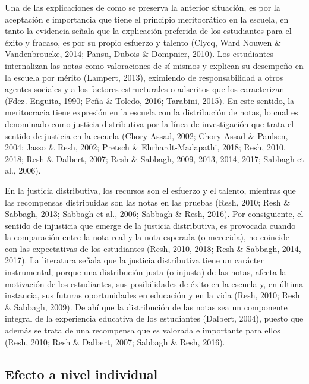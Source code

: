 \documentclass[12pt,twoside]{templates/facsothesis}
\begin{document}
Una de las explicaciones de como se preserva la anterior situación, es por la aceptación e importancia que tiene el principio meritocrático en la escuela, en tanto la evidencia señala que la explicación preferida de los estudiantes para el éxito y fracaso, es por su propio esfuerzo y talento (Clycq, Ward Nouwen \& Vandenbroucke, 2014; Pansu, Dubois \& Dompnier, 2010). Los estudiantes internalizan las notas como valoraciones de sí mismos y explican su desempeño en la escuela por mérito (Lampert, 2013), eximiendo de responsabilidad a otros agentes sociales y a los factores estructurales o adscritos que los caracterizan (Fdez. Enguita, 1990; Peña \& Toledo, 2016; Tarabini, 2015). En este sentido, la meritocracia tiene expresión en la escuela con la distribución de notas, lo cual es denominado como justicia distributiva por la línea de investigación que trata el sentido de justicia en la escuela (Chory-Assad, 2002; Chory-Assad \& Paulsen, 2004; Jasso \& Resh, 2002; Pretsch \& Ehrhardt-Madapathi, 2018; Resh, 2010, 2018; Resh \& Dalbert, 2007; Resh \& Sabbagh, 2009, 2013, 2014, 2017; Sabbagh et al., 2006).

En la justicia distributiva, los recursos son el esfuerzo y el talento, mientras que las recompensas distribuidas son las notas en las pruebas (Resh, 2010; Resh \& Sabbagh, 2013; Sabbagh et al., 2006; Sabbagh \& Resh, 2016). Por consiguiente, el sentido de injusticia que emerge de la justicia distributiva, es provocada cuando la comparación entre la nota real y la nota esperada (o merecida), no coincide con las expectativas de los estudiantes (Resh, 2010, 2018; Resh \& Sabbagh, 2014, 2017). La literatura señala que la justicia distributiva tiene un carácter instrumental, porque una distribución justa (o injusta) de las notas, afecta la motivación de los estudiantes, sus posibilidades de éxito en la escuela y, en última instancia, sus futuras oportunidades en educación y en la vida (Resh, 2010; Resh \& Sabbagh, 2009). De ahí que la distribución de las notas sea un componente integral de la experiencia educativa de los estudiantes (Dalbert, 2004), puesto que además se trata de una recompensa que es valorada e importante para ellos (Resh, 2010; Resh \& Dalbert, 2007; Sabbagh \& Resh, 2016).

\hypertarget{efecto-a-nivel-individual}{%
\subsection{Efecto a nivel individual}\label{efecto-a-nivel-individual}}
\end{document}
